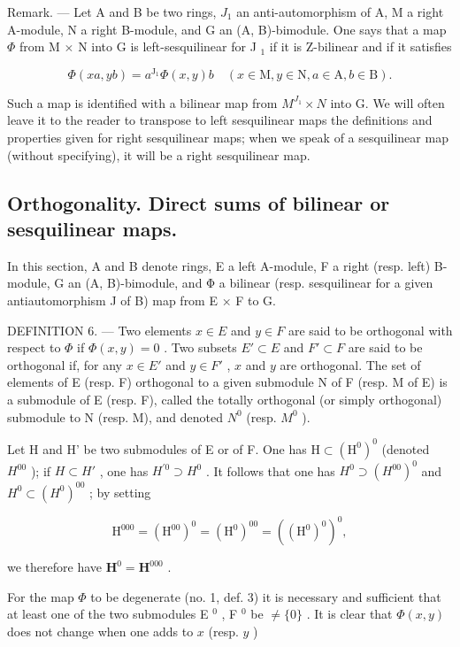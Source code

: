 Remark. --- Let A and B be two rings, \(J_{1}\) an anti-automorphism of A, M a right A-module, N a right B-module, and G an (A, B)-bimodule. One says that a map \(\Phi\) from M \(\times\) N into G is left-sesquilinear for J \(_{1}\) if it is Z-bilinear and if it satisfies

\[
\Phi (x a, y b) = a ^ {\mathrm{J} _ {1}} \Phi (x, y) b \quad (x \in \mathrm{M}, y \in \mathrm{N}, a \in \mathrm{A}, b \in \mathrm{B}).\tag{9}
\]

Such a map is identified with a bilinear map from \(M^{J_{1}} \times N\) into G. We will often leave it to the reader to transpose to left sesquilinear maps the definitions and properties given for right sesquilinear maps; when we speak of a sesquilinear map (without specifying), it will be a right sesquilinear map.

\subsection{Orthogonality. Direct sums of bilinear or sesquilinear maps.}

In this section, A and B denote rings, E a left A-module, F a right (resp. left) B-module, G an (A, B)-bimodule, and Φ a bilinear (resp. sesquilinear for a given antiautomorphism J of B) map from E × F to G.

DEFINITION 6. --- Two elements \(x \in E\) and \(y \in F\) are said to be orthogonal with respect to \(\Phi\) if \(\Phi(x, y) = 0\) . Two subsets \(E' \subset E\) and \(F' \subset F\) are said to be orthogonal if, for any \(x \in E'\) and \(y \in F'\) , \(x\) and \(y\) are orthogonal. The set of elements of E (resp. F) orthogonal to a given submodule N of F (resp. M of E) is a submodule of E (resp. F), called the totally orthogonal (or simply orthogonal) submodule to N (resp. M), and denoted \(N^0\) (resp. \(M^0\) ).

Let H and H' be two submodules of E or of F. One has \(\mathrm{H}\subset(\mathrm{H}^{0})^{0}\) (denoted \(H^{00}\) ); if \(H\subset H'\) , one has \(H^{\prime0}\supset H^{0}\) . It follows that one has \(H^{0}\supset(H^{00})^{0}\) and \(H^{0}\subset(H^{0})^{00}\) ; by setting

\[
\mathrm{H} ^ {0 0 0} = (\mathrm{H} ^ {0 0}) ^ {0} = (\mathrm{H} ^ {0}) ^ {0 0} = ((\mathrm{H} ^ {0}) ^ {0}) ^ {0},
\]

we therefore have \(\mathbf{H}^0 = \mathbf{H}^{000}\) .

For the map \(\Phi\) to be degenerate (no. 1, def. 3) it is necessary and sufficient that at least one of the two submodules E \(^{0}\) , F \(^{0}\) be \(\neq \{0\}\) . It is clear that \(\Phi(x, y)\) does not change when one adds to \(x\) (resp. \(y\) )

